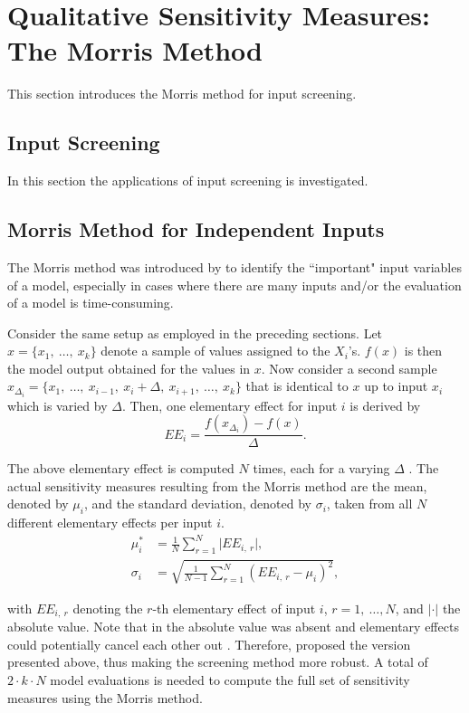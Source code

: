 \section{Qualitative Sensitivity Measures: The Morris Method} \label{comp_morris}

This section introduces the Morris method for input screening.

\subsection{Input Screening}

In this section the applications of input screening is investigated.

\subsection{Morris Method for Independent Inputs} \label{classic_morris}

The Morris method was introduced by \citet{M91} to identify the ``important" input variables of a model, especially in cases where there are many inputs and/or the evaluation of a model is time-consuming.

Consider the same setup as employed in the preceding sections. Let $x = \{x_1,\ \dots,\ x_k\}$ denote a sample of values assigned to the $X_i$'s. $f(x)$ is then the model output obtained for the values in $x$. Now consider a second sample $x_{\Delta_i} = \{x_1,\ \dots,\ x_{i-1},\ x_i + \Delta,\ x_{i+1},\ \dots,\ x_k\}$ that is identical to $x$ up to input $x_i$ which is varied by $\Delta$. Then, one elementary effect for input $i$ is derived by
\begin{equation}
EE_i = \frac{f(x_{\Delta_i}) - f(x)}{\Delta}.
\end{equation}

The above elementary effect is computed $N$ times, each for a varying $\Delta$ \citep{GM17}. The actual sensitivity measures resulting from the Morris method are the mean, denoted by $\mu_i$, and the standard deviation, denoted by $\sigma_i$, taken from all $N$ different elementary effects per input $i$.
\begin{align}
\mu_i^\ast& = \frac{1}{N} \sum_{r=1}^N \vert EE_{i,\ r} \vert, \label{mu}\\
\sigma_i& = \sqrt{\frac{1}{N-1} \sum_{r=1}^N (EE_{i,\ r} - \mu_i)^2}, \label{sigma}
\end{align}

\noindent with $EE_{i,\ r}$ denoting the $r$-th elementary effect of input $i$, $r = 1,\ \dots, N$, and $\vert \cdot \vert$ the absolute value. Note that in \citet{M91} the absolute value was absent and elementary effects could potentially cancel each other out \citep{CCS07}. Therefore, \citet{CCS07} proposed the version presented above, thus making the screening method more robust. A total of $2 \cdot k \cdot N$ model evaluations is needed to compute the full set of sensitivity measures using the Morris method.

